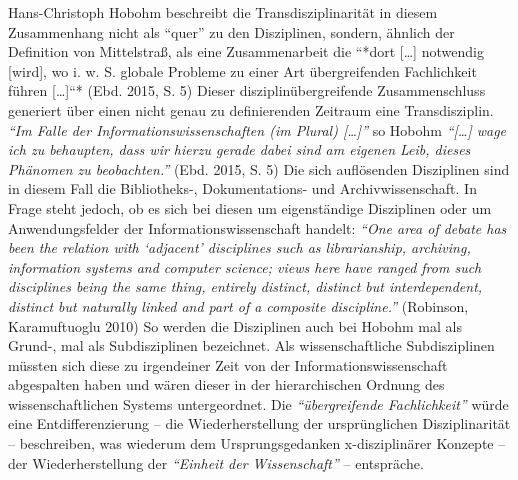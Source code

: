 \documentclass[a4paper,
fontsize=11pt,
oneside,
numbers=noperiodatend,
parskip=half-,
bibliography=totoc,
final
]{scrartcl}
\begin{document}
Hans-Christoph Hobohm beschreibt die Transdisziplinarität in diesem
Zusammenhang nicht als \enquote{quer} zu den Disziplinen, sondern,
ähnlich der Definition von Mittelstraß, als eine Zusammenarbeit die
``*dort {[}\ldots{}{]} notwendig {[}wird{]}, wo i. w. S. globale
Probleme zu einer Art übergreifenden Fachlichkeit führen
{[}\ldots{}{]}``* (Ebd. 2015, S. 5) Dieser disziplinübergreifende
Zusammenschluss generiert über einen nicht genau zu definierenden
Zeitraum eine Transdisziplin. \emph{\enquote{Im Falle der
Informationswissenschaften (im Plural) {[}\ldots{}{]}}} so Hobohm
\emph{\enquote{{[}\ldots{}{]} wage ich zu behaupten, dass wir hierzu
gerade dabei sind am eigenen Leib, dieses Phänomen zu beobachten.}}
(Ebd. 2015, S. 5) Die sich auflösenden Disziplinen sind in diesem Fall
die Bibliotheks-, Dokumentations- und Archivwissenschaft. In Frage steht
jedoch, ob es sich bei diesen um eigenständige Disziplinen oder um
Anwendungsfelder der Informationswissenschaft handelt:
\emph{\enquote{One area of debate has been the relation with
\enquote{adjacent} disciplines such as librarianship, archiving,
information systems and computer science; views here have ranged from
such disciplines being the same thing, entirely distinct, distinct but
interdependent, distinct but naturally linked and part of a composite
discipline.}} (Robinson, Karamuftuoglu 2010) So werden die Disziplinen
auch bei Hobohm mal als Grund-, mal als Subdisziplinen bezeichnet. Als
wissenschaftliche Subdisziplinen müssten sich diese zu irgendeiner Zeit
von der Informationswissenschaft abgespalten haben und wären dieser in
der hierarchischen Ordnung des wissenschaftlichen Systems untergeordnet.
Die \emph{\enquote{übergreifende Fachlichkeit}} würde eine
Entdifferenzierung -- die Wiederherstellung der ursprünglichen
Disziplinarität -- beschreiben, was wiederum dem Ursprungsgedanken
x-disziplinärer Konzepte -- der Wiederherstellung der
\emph{\enquote{Einheit der Wissenschaft}} -- entspräche.
\end{document}
